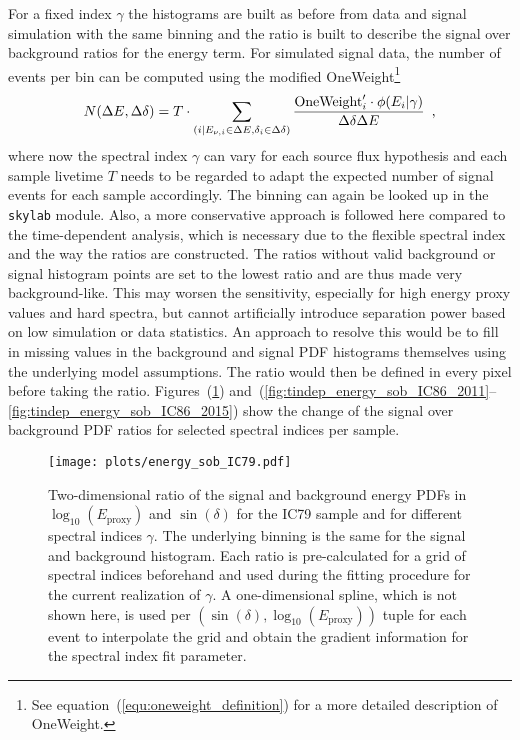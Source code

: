 For a fixed index $\gamma$ the histograms are built as before from data and signal simulation with the same binning and the ratio is built to describe the signal over background ratios for the energy term.
For simulated signal data, the number of events per bin can be computed using the modified OneWeight\footnote{See equation~(\ref{equ:oneweight_definition}) for a more detailed description of OneWeight.}
\begin{equation}
  N(\Delta E, \Delta\delta)
  = T\cdot \sum_{(i|E_{\nu,i}\in\Delta E, \delta_i\in\Delta\delta)}
    \frac{\text{OneWeight}'_i \cdot \phi(E_i|\gamma)}{\Delta\delta \Delta E}
  \enspace\text{,}
\end{equation}
where now the spectral index $\gamma$ can vary for each source flux hypothesis and each sample livetime $T$ needs to be regarded to adapt the expected number of signal events for each sample accordingly.
The binning can again be looked up in the \lstinline!skylab! module.
Also, a more conservative approach is followed here compared to the time-dependent analysis, which is necessary due to the flexible spectral index and the way the ratios are constructed.
The ratios without valid background or signal histogram points are set to the lowest ratio and are thus made very background-like.
This may worsen the sensitivity, especially for high energy proxy values and hard spectra, but cannot artificially introduce separation power based on low simulation or data statistics.
An approach to resolve this would be to fill in missing values in the background and signal PDF histograms themselves using the underlying model assumptions.
The ratio would then be defined in every pixel before taking the ratio.
Figures~(\ref{fig:tindep_energy_sob_IC79}) and~(\ref{fig:tindep_energy_sob_IC86_2011}--\ref{fig:tindep_energy_sob_IC86_2015}) show the change of the signal over background PDF ratios for selected spectral indices per sample.

\begin{figure}[htpb]
  \centering
  \texttt{[image: plots/energy\_sob\_IC79.pdf]}
  \caption[Energy PDF for the time-integrated analysis for IC79]{
    Two-dimensional ratio of the signal and background energy PDFs in $\log_{10}\left(E_\text{proxy}\right)$ and $\sin(\delta)$ for the IC79 sample and for different spectral indices $\gamma$.
    The underlying binning is the same for the signal and background histogram.
    Each ratio is pre-calculated for a grid of spectral indices beforehand and used during the fitting procedure for the current realization of $\gamma$.
    A one-dimensional spline, which is not shown here, is used per $\left(\sin(\delta), \log_{10}\left(E_\text{proxy}\right)\right)$ tuple for each event to interpolate the grid and obtain the gradient information for the spectral index fit parameter.
  }
  \label{fig:tindep_energy_sob_IC79}
\end{figure}

